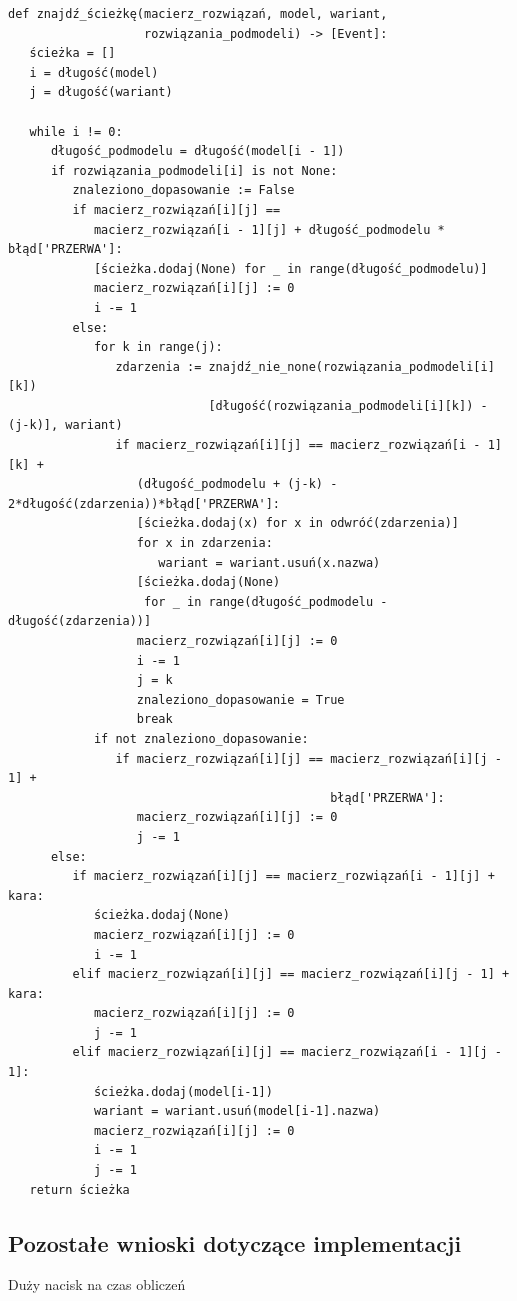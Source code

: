 \lstset{caption=Znajdowanie ścieżki w modelu, captionpos=b}
\lstset{label=src:traceback, frame=single}
\begin{lstlisting}[escapeinside=``]
def znajdź_ścieżkę(macierz_rozwiązań, model, wariant, 
                   rozwiązania_podmodeli) -> [Event]:
   ścieżka = []
   i = długość(model)
   j = długość(wariant) 
    
   while i != 0:
      długość_podmodelu = długość(model[i - 1])
      if rozwiązania_podmodeli[i] is not None:
         znaleziono_dopasowanie := False
         if macierz_rozwiązań[i][j] == 
            macierz_rozwiązań[i - 1][j] + długość_podmodelu * błąd['PRZERWA']:
            [ścieżka.dodaj(None) for _ in range(długość_podmodelu)]
            macierz_rozwiązań[i][j] := 0
            i -= 1
         else:
            for k in range(j):
               zdarzenia := znajdź_nie_none(rozwiązania_podmodeli[i][k])
                            [długość(rozwiązania_podmodeli[i][k]) - (j-k)], wariant)
               if macierz_rozwiązań[i][j] == macierz_rozwiązań[i - 1][k] + 
                  (długość_podmodelu + (j-k) - 2*długość(zdarzenia))*błąd['PRZERWA']:
                  [ścieżka.dodaj(x) for x in odwróć(zdarzenia)]
                  for x in zdarzenia:
                     wariant = wariant.usuń(x.nazwa)
                  [ścieżka.dodaj(None) 
                   for _ in range(długość_podmodelu - długość(zdarzenia))]
                  macierz_rozwiązań[i][j] := 0
                  i -= 1
                  j = k
                  znaleziono_dopasowanie = True
                  break
            if not znaleziono_dopasowanie:
               if macierz_rozwiązań[i][j] == macierz_rozwiązań[i][j - 1] + 
                                             błąd['PRZERWA']:
                  macierz_rozwiązań[i][j] := 0
                  j -= 1
      else:
         if macierz_rozwiązań[i][j] == macierz_rozwiązań[i - 1][j] + kara:
            ścieżka.dodaj(None)
            macierz_rozwiązań[i][j] := 0
            i -= 1
         elif macierz_rozwiązań[i][j] == macierz_rozwiązań[i][j - 1] + kara:
            macierz_rozwiązań[i][j] := 0
            j -= 1
         elif macierz_rozwiązań[i][j] == macierz_rozwiązań[i - 1][j - 1]:
            ścieżka.dodaj(model[i-1])
            wariant = wariant.usuń(model[i-1].nazwa)
            macierz_rozwiązań[i][j] := 0
            i -= 1 
            j -= 1
   return ścieżka
\end{lstlisting}

\subsection{Pozostałe wnioski dotyczące implementacji}
Duży nacisk na czas obliczeń

